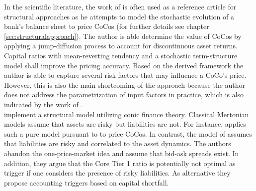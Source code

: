 In the scientific literature, the work of \citet{pennacchi2010structural} is often used as a reference article for structural approaches as he attempts to model the stochastic evolution of a bank's balance sheet to price CoCos (for further details see chapter \ref{sec:structuralapproach}). The author is able determine the value of CoCos by applying a jump-diffusion process to account for discontinuous asset returns. Capital ratios with mean-reverting tendency and a stochastic term-structure model shall improve the pricing accuracy. Based on the derived framework the author is able to capture several risk factors that may influence a CoCo's price. However, this is also the main shortcoming of the approach because the author does not address the parametrization of input factors in practice, which is also indicated by the work of \citet{erismann2015pricing}.\\

\citet{madan2011conic} implement a structural model utilizing conic finance theory. Classical Mertonian models \citep{merton1974pricing} assume that assets are risky but liabilities are not. For instance, \citet{alvemar2012modelling} applies such a pure model pursuant to \citet{merton1974pricing} to price CoCos. In contrast, the model of \citet{madan2011conic} assumes that liabilities are risky and correlated to the asset dynamics. The authors abandon the one-price-market idea and assume that bid-ask spreads exist. In addition, they argue that the Core Tier 1 ratio is potentially not optimal as trigger if one considers the presence of risky liabilities. As alternative they propose accounting triggers based on capital shortfall.


